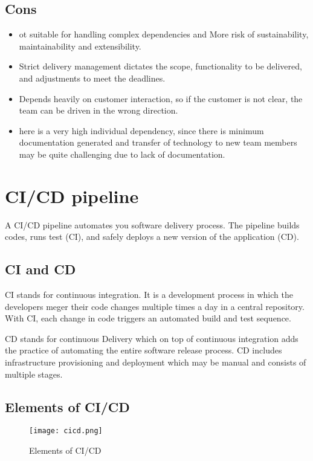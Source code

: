 \subsection{Cons}
\begin{itemize}
    \item ot suitable for handling complex dependencies and More risk of sustainability, maintainability and extensibility.
    \item Strict delivery management dictates the scope, functionality to be delivered, and adjustments to meet the deadlines.
    \item Depends heavily on customer interaction, so if the customer is not clear, the team can be driven in the wrong direction.
    \item here is a very high individual dependency, since there is minimum documentation generated and transfer of technology to new team members may be quite challenging due to lack of documentation.
\end{itemize}

\section{CI/CD pipeline}
A CI/CD pipeline automates you software delivery process. The pipeline builds codes, runs test (CI),
and safely deploys a new version of the application (CD).

\subsection{CI and CD}
CI stands for continuous integration. It is a development process in which the developers meger
their code changes multiple times a day in a central repository. With CI, each change in code 
triggers an automated build and test sequence.

CD stands for continuous Delivery which on top of continuous integration adds the practice of 
automating the entire software release process. CD includes infrastructure provisioning and deployment 
which may be manual and consists of multiple stages.

\subsection{Elements of CI/CD}

\begin{figure}[h!]
    \begin{center}
        \texttt{[image: cicd.png]}
    \end{center}
    \caption{Elements of CI/CD}
    \label{fig:cicd}
\end{figure}

